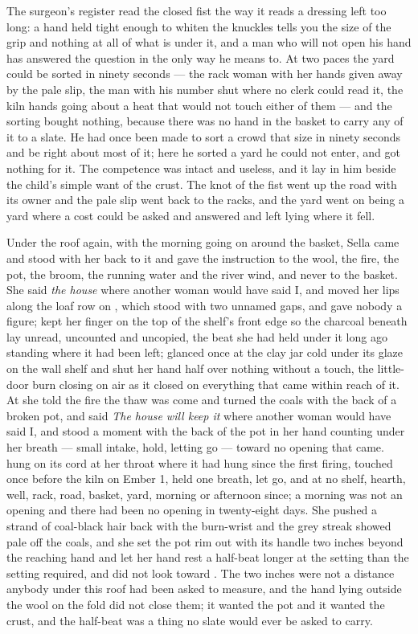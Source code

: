 The surgeon's register read the closed fist the way it reads a dressing left too long: a hand held tight enough to whiten the knuckles tells you the size of the grip and nothing at all of what is under it, and a man who will not open his hand has answered the question in the only way he means to. At two paces the yard could be sorted in ninety seconds --- the rack woman with her hands given away by the pale slip, the man with his number shut where no clerk could read it, the kiln hands going about a heat that would not touch either of them --- and the sorting bought nothing, because there was no hand in the basket to carry any of it to a slate. He had once been made to sort a crowd that size in ninety seconds and be right about most of it; here he sorted a yard he could not enter, and got nothing for it. The competence was intact and useless, and it lay in him beside the child's simple want of the crust. The knot of the fist went up the road with its owner and the pale slip went back to the racks, and the yard went on being a yard where a cost could be asked and answered and left lying where it fell.

\scenebreak

Under the roof again, with the morning going on around the basket, Sella came and stood with her back to it and gave the instruction to the wool, the fire, the pot, the broom, the running water and the river wind, and never to the basket. She said \emph{the house} where another woman would have said I, and moved her lips along the loaf row on , which stood with two unnamed gaps, and gave nobody a figure; kept her finger on the top of the shelf's front edge so the charcoal beneath lay unread, uncounted and uncopied, the beat she had held under it long ago standing where it had been left; glanced once at the clay jar cold under its glaze on the wall shelf and shut her hand half over nothing without a touch, the little-door burn closing on air as it closed on everything that came within reach of it. At  she told the fire the thaw was come and turned the coals with the back of a broken pot, and said \emph{The house will keep it} where another woman would have said I, and stood a moment with the back of the pot in her hand counting under her breath --- small intake, hold, letting go --- toward no opening that came.  hung on its cord at her throat where it had hung since the first firing, touched once before the kiln on Ember 1, held one breath, let go, and at no shelf, hearth, well, rack, road, basket, yard, morning or afternoon since; a morning was not an opening and there had been no opening in twenty-eight days. She pushed a strand of coal-black hair back with the burn-wrist and the grey streak showed pale off the coals, and she set the pot rim out with its handle two inches beyond the reaching hand and let her hand rest a half-beat longer at the setting than the setting required, and did not look toward . The two inches were not a distance anybody under this roof had been asked to measure, and the hand lying outside the wool on the fold did not close them; it wanted the pot and it wanted the crust, and the half-beat was a thing no slate would ever be asked to carry.

